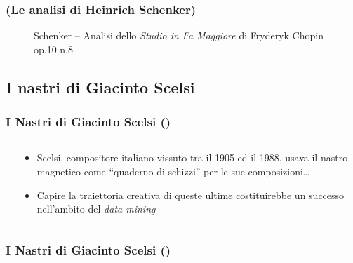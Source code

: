 \documentclass[compress]{beamer}
\begin{document}
\begin{frame}
    \frametitle{(Le analisi di Heinrich Schenker)}

    \begin{center}
        \begin{figure}
            \caption{Schenker -- Analisi dello \emph{Studio in Fa Maggiore} di Fryderyk Chopin op.10 n.8}
        \end{figure}
    \end{center}

\end{frame}

\subsection[Scelsi]{I nastri di Giacinto Scelsi}

\setcounter{ms}{0}
\begin{frame}
    \frametitle<+- | alert@+->{I Nastri di Giacinto Scelsi ()}
    
    \begin{columns}[T]
        \begin{column}{0.3\textwidth}
        \end{column}
        \begin{column}{0.7\textwidth}
            \begin{itemize}[<+- | alert@+->]
                \item Scelsi, compositore italiano vissuto tra il 1905 ed il
                    1988, usava il nastro magnetico come
                    ``quaderno di schizzi'' per le sue composizioni\dots
                \item Capire la traiettoria creativa di queste ultime
                    costituirebbe un successo nell'ambito del \emph{data
                    mining}
            \end{itemize}
        \end{column}
    \end{columns}

\end{frame}

\begin{frame}
    \frametitle{I Nastri di Giacinto Scelsi ()}
    
    \begin{center}
    \end{center}

\end{frame}
\end{document}
